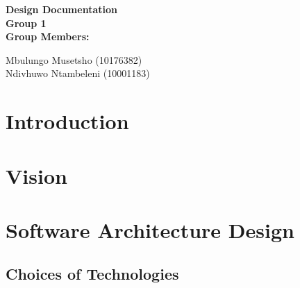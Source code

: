 \documentclass[12pt]{article}
\newcommand{\Title}{Design Documentation} %
\begin{document}
	\vspace{4em}
	
	\begin{center}%
	
	  \LARGE \bf \Title \\[4em]
	  \LARGE {\bf Group 1}\\[1em]
	  \LARGE {\bf Group Members:}\\[2em]
	  \large
	  
	     Mbulungo Musetsho				(10176382) \\[1em]
	     Ndivhuwo Ntambeleni			(10001183) \\[1em]
	    
	\end{center}%
	

	\newpage
	\tableofcontents
	
	\newpage
	\section{Introduction}
	
		\vspace{0.2in}
	
		
		 
	
	\section{Vision}
	
		\vspace{0.2in}
		
				
	
	\section{Software Architecture Design}
		\vspace{0.2in}
		
		\subsection{Choices of Technologies}
			\vspace{0.2in}
		
\end{document}
